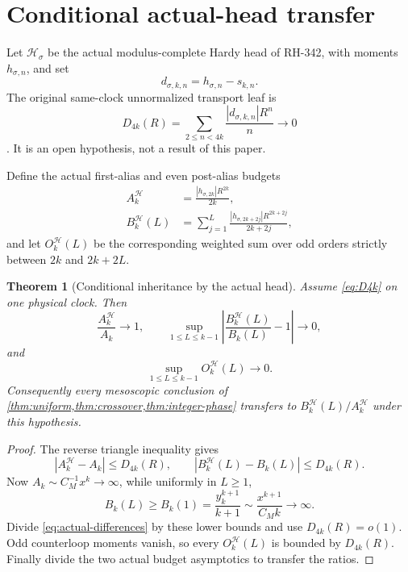 \documentclass[11pt]{article}
\newtheorem{theorem}{Theorem}[section]
\theoremstyle{remark}
\newcommand{\cH}{\mathcal H}
\begin{document}
\section{Conditional actual-head transfer}

Let $\cH_\sigma$ be the actual modulus-complete Hardy head of RH-342, with
moments $h_{\sigma,n}$, and set
\begin{equation}\label{eq:defect}
 d_{\sigma,k,n}=h_{\sigma,n}-s_{k,n}.
\end{equation}
The original same-clock unnormalized transport leaf is
\begin{equation}\label{eq:D4k}
 D_{4k}(R)=\sum_{2\le n<4k}
 \frac{|d_{\sigma,k,n}|R^n}{n}\longrightarrow0
\end{equation}
\citep{WangGluing2026,WangSynchronization2026}.  It is an open hypothesis,
not a result of this paper.

Define the actual first-alias and even post-alias budgets
\begin{align}
 A_k^{\cH}
 &=\frac{|h_{\sigma,2k}|R^{2k}}{2k},
 \label{eq:AH}\\
 B_k^{\cH}(L)
 &=\sum_{j=1}^L
 \frac{|h_{\sigma,2k+2j}|R^{2k+2j}}{2k+2j},
 \label{eq:BH}
\end{align}
and let $O_k^{\cH}(L)$ be the corresponding weighted sum over odd orders
strictly between $2k$ and $2k+2L$.

\begin{theorem}[Conditional inheritance by the actual head]
\label{thm:actual-conditional}
Assume \eqref{eq:D4k} on one physical clock.  Then
\begin{equation}\label{eq:actual-alias}
 \frac{A_k^{\cH}}{A_k}\longrightarrow1,
 \qquad
 \sup_{1\le L\le k-1}
 \left|\frac{B_k^{\cH}(L)}{B_k(L)}-1\right|
 \longrightarrow0,
\end{equation}
and
\begin{equation}\label{eq:actual-odd}
 \sup_{1\le L\le k-1}O_k^{\cH}(L)\longrightarrow0.
\end{equation}
Consequently every mesoscopic conclusion of
\cref{thm:uniform,thm:crossover,thm:integer-phase} transfers to
$B_k^{\cH}(L)/A_k^{\cH}$ under this hypothesis.
\end{theorem}

\begin{proof}
The reverse triangle inequality gives
\begin{equation}\label{eq:actual-differences}
 |A_k^{\cH}-A_k|\le D_{4k}(R),
 \qquad
 |B_k^{\cH}(L)-B_k(L)|\le D_{4k}(R).
\end{equation}
Now $A_k\sim C_M^{-1}x^k\to\infty$, while uniformly in $L\ge1$,
\[
 B_k(L)\ge B_k(1)
 =\frac{y_k^{k+1}}{k+1}
 \sim\frac{x^{k+1}}{C_Mk}\longrightarrow\infty.
\]
Divide \eqref{eq:actual-differences} by these lower bounds and use
$D_{4k}(R)=o(1)$.  Odd counterloop moments vanish, so every
$O_k^{\cH}(L)$ is bounded by $D_{4k}(R)$.  Finally divide the two actual
budget asymptotics to transfer the ratios.
\end{proof}
\end{document}
